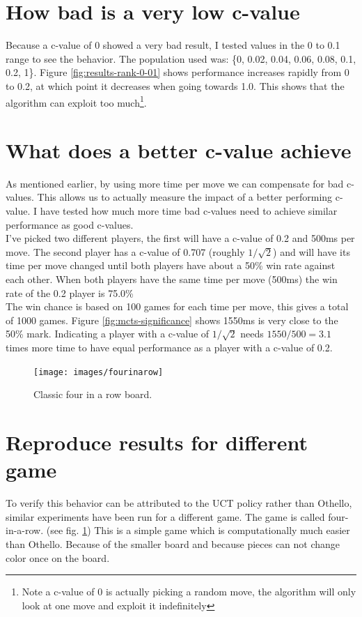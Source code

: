 \documentclass[
11pt, %
english, %
singlespacing, %
headsepline, %
]{MastersDoctoralThesis} %
\begin{document}
\section{How bad is a very low c-value}
Because a c-value of 0 showed a very bad result, I tested values in the 0 to 0.1 range to see the behavior. The population used was: \{0, 0.02, 0.04, 0.06, 0.08, 0.1, 0.2, 1\}. Figure \ref{fig:results-rank-0-01} shows performance increases rapidly from 0 to 0.2, at which point it decreases when going towards 1.0. This shows that the algorithm can exploit too much\footnote{Note a c-value of 0 is actually picking a random move, the algorithm will only look at one move and exploit it indefinitely}.

\begin{figure}[h]

\end{figure}
\section{What does a better c-value achieve}
\label{section:optimal-cvalue-achieve}
As mentioned earlier, by using more time per move we can compensate for bad c-values. This allows us to actually measure the impact of a better performing c-value. I have tested how much more time bad c-values need to achieve similar performance as good c-values.\\
I've picked two different players, the first will have a c-value of 0.2 and 500ms per move. The second player has a c-value of 0.707 (roughly $1/\sqrt{2}$) and will have its time per move changed until both players have about a 50\% win rate against each other. When both players have the same time per move (500ms) the win rate of the 0.2 player is 75.0\%\\
The win chance is based on 100 games for each time per move, this gives a total of 1000 games. Figure \ref{fig:mcts-significance} shows 1550ms is very close to the 50\% mark. Indicating a player with a c-value of $1/\sqrt{2}$ needs $1550/500 = 3.1$ times more time to have equal performance as a player with a c-value of 0.2.

\vfill
\pagebreak
\begin{figure}
	\centering
	\texttt{[image: images/fourinarow]}
	\caption{Classic four in a row board.}
	\label{fig:fourinarow-board}
\end{figure}
\section{Reproduce results for different game}
To verify this behavior can be attributed to the UCT policy rather than Othello, similar experiments have been run for a different game. The game is called four-in-a-row. (see fig. \ref{fig:fourinarow-board}) This is a simple game which is computationally much easier than Othello. Because of the smaller board and because pieces can not change color once on the board.
\end{document}
